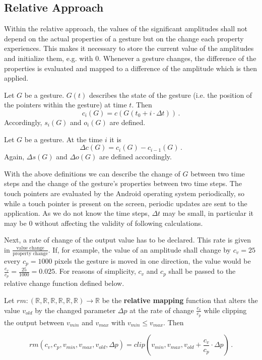 \subsection{Relative Approach}
\label{sec:app:rel}
Within the relative approach, the values of the significant amplitudes shall not depend on the actual properties of a gesture but on the change each property experiences. This makes it necessary to store the current value of the amplitudes and initialize them, e.g. with 0. Whenever a gesture changes, the difference of the properties is evaluated and mapped to a difference of the amplitude which is then applied.

\begin{defn}
Let $G$ be a gesture. $G(t)$ describes the state of the gesture (i.e. the position of the pointers within the gesture) at time $t$. Then
\begin{equation}
c_i(G) = c(G(t_0 + i \cdot \Delta t)) \, .
\end{equation}
Accordingly, $s_i(G)$ and $o_i(G)$ are defined.
\end{defn}

\begin{defn}
Let $G$ be a gesture. At the time $i$ it is
\begin{equation}
\Delta c(G) = c_i(G) - c_{i - 1}(G) \, .
\end{equation}
Again, $\Delta s(G)$ and $\Delta o(G)$ are defined accordingly.
\end{defn}

With the above definitions we can describe the change of $G$ between two time steps and the change of the gesture's properties between two time steps. The touch pointers are evaluated by the Android operating system periodically, so while a touch pointer is present on the screen, periodic updates are sent to the application. As we do not know the time steps, $\Delta t$ may be small, in particular it may be $0$ without affecting the validity of following calculations.

Next, a rate of change of the output value has to be declared. This rate is given in $\frac{\text{value change}}{\text{property change}}$. If, for example, the value of an amplitude shall change by $c_v = 25$ every $c_p = 1000$ pixels the gesture is moved in one direction, the value would be $\frac{c_v}{c_p} = \frac{25}{1000} = 0.025$. For reasons of simplicity, $c_v$ and $c_p$ shall be passed to the relative change function defined below.

\begin{defn}
Let $rm : (\mathbb{R}, \mathbb{R}, \mathbb{R}, \mathbb{R}, \mathbb{R}, \mathbb{R}) \rightarrow \mathbb{R}$ be the \textbf{relative mapping} function that alters the value $v_{old}$ by the changed parameter $\Delta p$ at the rate of change $\frac{c_v}{c_p}$ while clipping the output between $v_{min}$ and $v_{max}$ with $v_{min} \leq v_{max}$. Then

\begin{equation}
rm(c_v, c_p, v_{min}, v_{max}, v_{old}, \Delta p) = clip(v_{min}, v_{max}, v_{old} + \frac{c_v}{c_p} \cdot \Delta p) \, .
\end{equation}
\end{defn}

